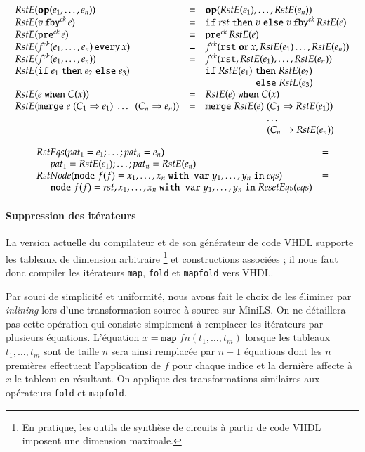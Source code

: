\documentclass[9pt,a4paper]{article}
\newcommand{\mybox}[1]{\mbox{\tt{#1}}}
\newcommand{\ind}[0]{\hspace{0.5cm}}
\newcommand{\Node}[4]{\mybox{node} \; f(#1) = #2 \; \mybox{with var} \
  #3 \; \mybox{in} \; #4}
\newcommand{\Op}[2]{\mybox{\bf{op}}(#1,\dots,#2)}
\newcommand{\Fby}[2]{#1 \, \mybox{fby}^{ck} \, #2}
\newcommand{\Pre}[1]{\mybox{pre}^{ck} \, #1}
\newcommand{\Every}[4]{#1^{ck}(#2,\dots,#3) \, \mybox{every} \, #4}
\newcommand{\App}[2]{#1^{ck}(#2)}
\newcommand{\If}[3]{\mybox{if} \; #1 \; \mybox{then} \; #2 \; \mybox{else} \; #3}
\newcommand{\When}[3]{#1 \; \mybox{when} \; #2(#3)}
\newcommand{\Merge}[5]{\mybox{merge} \; #1 \; (#2 \Rightarrow #3) \; \dots \; \
  (#4 \Rightarrow #5)}
\newcommand{\Map}[3]{\mathtt{map} \; #1 n (#2,\dots,#3)}
\begin{document}
\[
\begin{array}{lcl}
  \re{\Op{e_1}{e_n}} & = & \Op{\re{e_1}}{\re{e_n}} \\
  \re{\Fby{v}{e}} & = & \If{rst}{v}{\Fby{v}{\re{e}}} \\
  \re{\Pre{e}} & = & \Pre{\re{e}} \\
  \re{\Every{f}{e_1}{e_n}{x}} & = & \App{f}{\mathtt{rst} \; \mathbf{or} \;
    x, \re{e_1} \dots, \re{e_n}} \\
  \re{\App{f}{e_1,\dots,e_n}} & = &
  \App{f}{\mathtt{rst},\re{e_1},\dots,\re{e_n}} \\
  \re{\If{e_1}{e_2}{e_3}} & = & \If{\re{e_1}}{\re{e_2}\\ & & \hspace{1.7cm}}
  {\re{e_3}} \\
  \re{\When{e}{C}{x}} & = & \When{\re{e}}{C}{x} \\
  \re{\Merge{e}{C_1}{e_1}{C_n}{e_n}} & = &
  \mybox{merge} \; \re{e} \; (C_1 \Rightarrow \re{e_1}) \\
  & & \hspace{2.2cm} \dots \\
  & & \hspace{2.2cm} (C_n \Rightarrow \re{e_n})
\end{array}
\]

\[
\begin{array}{ll}
  RstEqs(pat_1 = e_1;\dots;pat_n = e_n) & = \\
  \ind pat_1 = \re{e_1};\dots;pat_n = \re{e_n} \\
  \rstn{\Node{f}{x_1,\dots,x_n}{y_1,\dots,y_n}{eqs}} & = \\
  \ind \Node{f}{rst,x_1,\dots,x_n}{y_1,\dots,y_n}{ResetEqs(eqs)}
\end{array}
\]

\paragraph{Suppression des itérateurs}

La version actuelle du compilateur et de son générateur de code VHDL supporte
les tableaux de dimension arbitraire \footnote{En pratique, les outils de
  synthèse de circuits à partir de code VHDL imposent une dimension maximale.}
et constructions associées ; il nous faut donc compiler les itérateurs
\texttt{map}, \texttt{fold} et \texttt{mapfold} vers VHDL.

Par souci de simplicité et uniformité, nous avons fait le choix de les éliminer
par \textit{inlining} lors d'une transformation source-à-source sur MiniLS. On
ne détaillera pas cette opération qui consiste simplement à remplacer les
itérateurs par plusieurs équations. L'équation $x = \Map{f}{t_1}{t_m}$ lorsque
les tableaux $t_1, \dots, t_m$ sont de taille $n$ sera ainsi remplacée par $n +
1$ équations dont les $n$ premières effectuent l'application de $f$ pour chaque
indice et la dernière affecte à $x$ le tableau en résultant. On applique des
transformations similaires aux opérateurs \texttt{fold} et \texttt{mapfold}.
\end{document}
